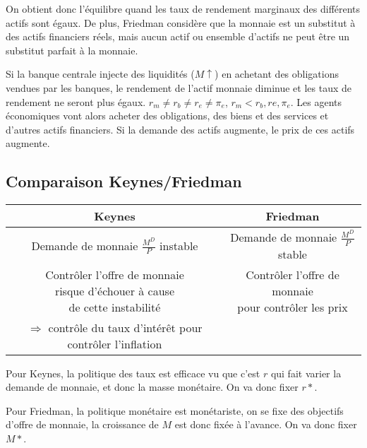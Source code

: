 	
	On obtient donc l'équilibre quand les taux de rendement marginaux des différents actifs sont égaux. De plus, Friedman considère que la monnaie est un substitut à des actifs financiers réels, mais aucun actif ou ensemble d'actifs ne peut être un substitut parfait à la monnaie.
	
	Si la banque centrale injecte des liquidités ($M \uparrow$) en achetant des obligations vendues par les banques, le rendement de l'actif monnaie diminue et les taux de rendement ne seront plus égaux. $r_m \neq r_b \neq r_e \neq \pi_e$, $r_m < r_b, re, \pi_e$. Les agents économiques vont alors acheter des obligations, des biens et des services et d'autres actifs financiers. Si la demande des actifs augmente, le prix de ces actifs augmente.
	

	\subsection{Comparaison Keynes/Friedman}
	
\begin{center}
 	\begin{tabular}{|c|c|}
	\hline 
	Keynes & Friedman \\ 
	\hline 
	Demande de monnaie $\frac{M^D}{P}$ instable & Demande de monnaie $\frac{M^D}{P}$ stable \\ 
	\hline 
	\specialcell{Contrôler l'offre de monnaie \\ risque d'échouer à cause \\ de cette instabilité} & \specialcell{Contrôler l'offre de monnaie \\ pour contrôler les prix} \\ 
	\hline 
	\specialcell{$\Rightarrow$ contrôle du taux d'intérêt \\ pour contrôler l'inflation} &  \\ 
	\hline 
	\end{tabular}
 \end{center} 
 
 	Pour Keynes, la politique des taux est efficace vu que c'est $r$ qui fait varier la demande de monnaie, et donc la masse monétaire. On va donc fixer $r*$.
 	
 	Pour Friedman, la politique monétaire est monétariste, on se fixe des objectifs d'offre de monnaie, la croissance de $M$ est donc fixée à l'avance. On va donc fixer $M*$.